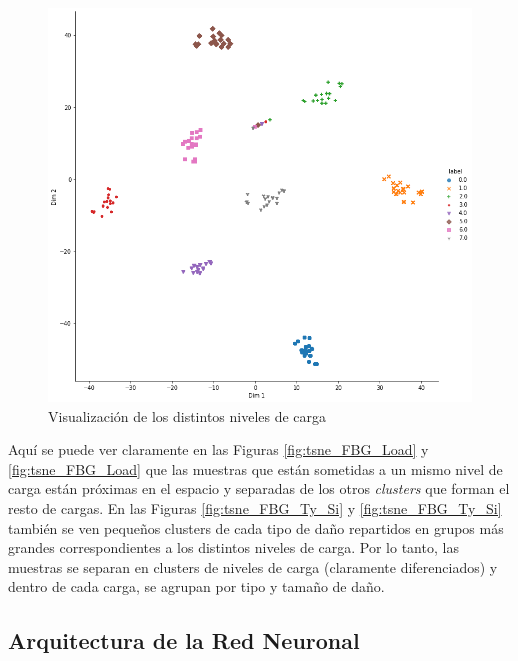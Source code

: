 \begin{itemize}
    \begin{figure}[H]
        \centering
        \includegraphics[width=150mm]{3/Fotos/tsne_Load_OBR_INESASSE.png}
        \captionsetup{justification=centering,margin=1.25cm}
        \caption{Visualización de los distintos niveles de carga}
        \label{fig:tsne_OBR_Load}
    \end{figure}      
    
    
\end{itemize}

Aquí se puede ver claramente en las Figuras \ref{fig:tsne_FBG_Load} y \ref{fig:tsne_FBG_Load} que las muestras que están sometidas a un mismo nivel de carga están próximas en el espacio y separadas de los otros \textit{clusters} que forman el resto de cargas. En las Figuras \ref{fig:tsne_FBG_Ty_Si} y \ref{fig:tsne_FBG_Ty_Si} también se ven pequeños clusters de cada tipo de daño repartidos en grupos más grandes correspondientes a los distintos niveles de carga. Por lo tanto, las muestras se separan en clusters de niveles de carga (claramente diferenciados) y dentro de cada carga, se agrupan por tipo y tamaño de daño.


\clearpage

\subsection{Arquitectura de la Red Neuronal}

